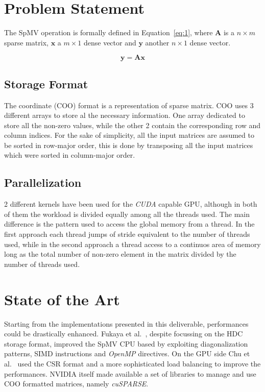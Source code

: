 \documentclass[conference]{IEEEtran}
\begin{document}
\section{Problem Statement}
The SpMV operation is formally defined in Equation~\ref{eq:1}, where \(\bm{A}\) is a \(n\times m\) sparse matrix, \(\bm{x}\) a \(m\times 1\) dense vector and \(\bm{y}\) another \(n\times 1\) dense vector.

\begin{equation}\label{eq:1}
\bm{y} = \bm{Ax}
\end{equation}

\subsection{Storage Format}
The coordinate (COO) format is a representation of sparse matrix. COO uses 3 different arrays to store al the necessary information. One array dedicated to store all the non-zero values, while the other 2 contain the corresponding row and column indices. For the sake of simplicity, all the input matrices are assumed to be sorted in row-major order, this is done by transposing all the input matrices which were sorted in column-major order.

\subsection{Parallelization}
2 different kernels have been used for the \emph{CUDA} capable GPU, although in both of them the workload is divided equally among all the threads used. The main difference is the pattern used to access the global memory from a thread. In the first approach each thread jumps of stride equivalent to the number of threads used, while in the second approach a thread access to a continuos area of memory long as the total number of non-zero element in the matrix divided by the number of threads used.

\section{State of the Art}
Starting from the implementations presented in this deliverable, performances could be drastically enhanced. Fukaya et al.~\cite{fukaya2021}, despite focussing on the HDC storage format, improved the SpMV CPU based by exploiting diagonalization patterns, SIMD instructions and \emph{OpenMP} directives. On the GPU side Chu et al.~\cite{chu2023} used the CSR format and a more sophisticated load balancing to improve the performances. NVIDIA itself made available a set of libraries to manage and use COO formatted matrices, namely \textit{cuSPARSE}.
\end{document}
